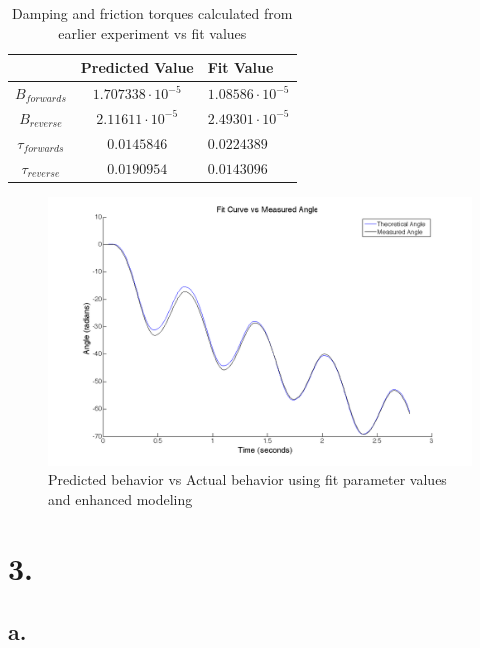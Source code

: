 \documentclass{article}
\theoremstyle{plain}
\theoremstyle{definition}
\theoremstyle{remark}
\begin{document}
\begin{table}[htb]
\begin{center}
    \begin{tabular}{|c|c|l|}
        \hline
        ~                 & Predicted Value          & Fit Value               \\ \hline
        $B_{forwards}$    & $1.707338 \cdot 10^{-5}$ & $1.08586 \cdot 10^{-5}$ \\ 
        $B_{reverse}$     & $2.11611 \cdot 10^{-5}$  & $2.49301 \cdot 10^{-5}$ \\ 
        $\tau_{forwards}$ & $0.0145846$              & $0.0224389$             \\ 
        $\tau_{reverse}$  & $0.0190954$              & $0.0143096$             \\
        \hline
    \end{tabular}
\caption{Damping and friction torques calculated from earlier experiment vs fit values}
\label{q2_b9}
\end{center}
\end{table}

\begin{figure}[htb]
\begin{center}
\includegraphics[width = 14cm]{awesomefitFiner.png}
\caption{Predicted behavior vs Actual behavior using fit parameter values and enhanced modeling}
\label{q2_b3}
\end{center}
\end{figure}

\clearpage

\section*{3.}
\subsection*{a.}
\end{document}

